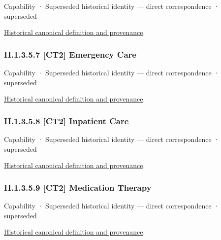 \label{element:03a57e0c9ea34f7fb7b78e5f5c85379f}
{\small Capability · Superseded historical identity — direct correspondence · superseded}\par
\href{../../../../continuum/strategy/capability/03a57e0c9ea34f7fb7b78e5f5c85379f.md}{Historical canonical definition and provenance}.\par
\subsubsection*{II.1.3.5.7 [CT2] Emergency Care}
\label{navigation:II.1.3.5.7}

\label{element:e5edbb54258c490aaba0816d980dc624}
{\small Capability · Superseded historical identity — direct correspondence · superseded}\par
\href{../../../../continuum/strategy/capability/e5edbb54258c490aaba0816d980dc624.md}{Historical canonical definition and provenance}.\par
\subsubsection*{II.1.3.5.8 [CT2] Inpatient Care}
\label{navigation:II.1.3.5.8}

\label{element:bcc40a14465e48aca42c9505a6853081}
{\small Capability · Superseded historical identity — direct correspondence · superseded}\par
\href{../../../../continuum/strategy/capability/bcc40a14465e48aca42c9505a6853081.md}{Historical canonical definition and provenance}.\par
\subsubsection*{II.1.3.5.9 [CT2] Medication Therapy}
\label{navigation:II.1.3.5.9}

\label{element:db064e0cd4794479be1374e97a3d7e63}
{\small Capability · Superseded historical identity — direct correspondence · superseded}\par
\href{../../../../continuum/strategy/capability/db064e0cd4794479be1374e97a3d7e63.md}{Historical canonical definition and provenance}.\par
